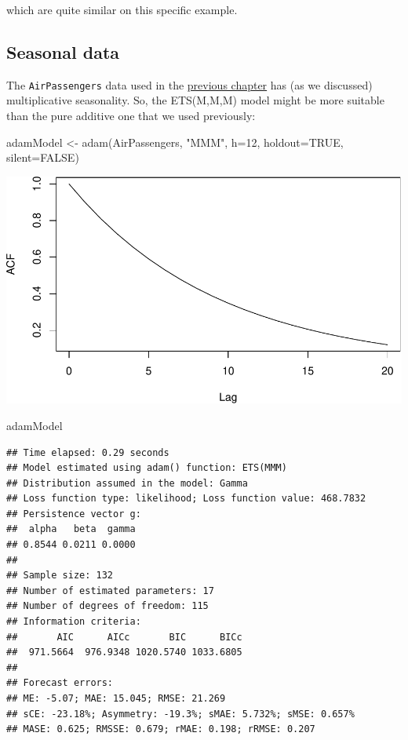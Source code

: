 \documentclass[
]{book}
\newenvironment{Shaded}{\begin{snugshade}}{\end{snugshade}}
\newcommand{\AttributeTok}[1]{\textcolor[rgb]{0.77,0.63,0.00}{#1}}
\newcommand{\ConstantTok}[1]{\textcolor[rgb]{0.00,0.00,0.00}{#1}}
\newcommand{\DecValTok}[1]{\textcolor[rgb]{0.00,0.00,0.81}{#1}}
\newcommand{\FunctionTok}[1]{\textcolor[rgb]{0.00,0.00,0.00}{#1}}
\newcommand{\NormalTok}[1]{#1}
\newcommand{\OtherTok}[1]{\textcolor[rgb]{0.56,0.35,0.01}{#1}}
\newcommand{\StringTok}[1]{\textcolor[rgb]{0.31,0.60,0.02}{#1}}
\theoremstyle{definition}
\theoremstyle{definition}
\theoremstyle{definition}
\theoremstyle{definition}
\theoremstyle{remark}
\begin{document}
which are quite similar on this specific example.

\hypertarget{seasonal-data}{%
\subsection{Seasonal data}\label{seasonal-data}}

The \texttt{AirPassengers} data used in the \protect\hyperlink{ADAMETSPureAdditiveExamples}{previous chapter} has (as we discussed) multiplicative seasonality. So, the ETS(M,M,M) model might be more suitable than the pure additive one that we used previously:

\begin{Shaded}
\begin{Highlighting}[]
\NormalTok{adamModel }\OtherTok{\textless{}{-}} \FunctionTok{adam}\NormalTok{(AirPassengers, }\StringTok{"MMM"}\NormalTok{, }\AttributeTok{h=}\DecValTok{12}\NormalTok{, }\AttributeTok{holdout=}\ConstantTok{TRUE}\NormalTok{,}
                  \AttributeTok{silent=}\ConstantTok{FALSE}\NormalTok{)}
\end{Highlighting}
\end{Shaded}

\includegraphics{adam_files/figure-latex/unnamed-chunk-45-1.pdf}

\begin{Shaded}
\begin{Highlighting}[]
\NormalTok{adamModel}
\end{Highlighting}
\end{Shaded}

\begin{verbatim}
## Time elapsed: 0.29 seconds
## Model estimated using adam() function: ETS(MMM)
## Distribution assumed in the model: Gamma
## Loss function type: likelihood; Loss function value: 468.7832
## Persistence vector g:
##  alpha   beta  gamma 
## 0.8544 0.0211 0.0000 
## 
## Sample size: 132
## Number of estimated parameters: 17
## Number of degrees of freedom: 115
## Information criteria:
##       AIC      AICc       BIC      BICc 
##  971.5664  976.9348 1020.5740 1033.6805 
## 
## Forecast errors:
## ME: -5.07; MAE: 15.045; RMSE: 21.269
## sCE: -23.18%; Asymmetry: -19.3%; sMAE: 5.732%; sMSE: 0.657%
## MASE: 0.625; RMSSE: 0.679; rMAE: 0.198; rRMSE: 0.207
\end{verbatim}
\end{document}
